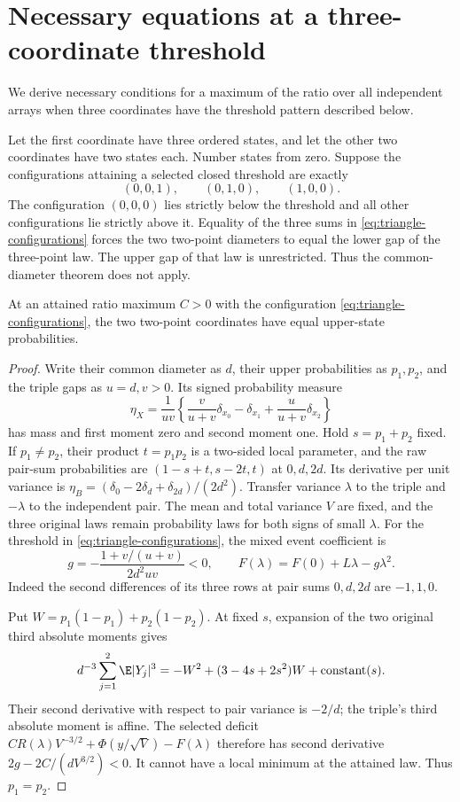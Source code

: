 \section{Necessary equations at a three-coordinate threshold}
\label{sec:triangular-contact}

We derive necessary conditions for a maximum of the ratio over all
independent arrays when three coordinates have the threshold pattern
described below.

Let the first coordinate have three ordered states, and let the other
two coordinates have two states each. Number states from zero. Suppose
the configurations attaining a selected closed threshold are exactly
\begin{equation}\label{eq:triangle-configurations}
                    (0,0,1),\qquad(0,1,0),\qquad(1,0,0).
\end{equation}
The configuration $(0,0,0)$ lies strictly below the threshold and all
other configurations lie strictly above it. Equality of the three sums
in \eqref{eq:triangle-configurations} forces the two two-point diameters
to equal the lower gap of the three-point law. The upper gap of that
law is unrestricted. Thus the common-diameter theorem does not apply.

\begin{proposition}
\label{prop:triangle-equal-probabilities}
At an attained ratio maximum $C>0$ with the configuration
\eqref{eq:triangle-configurations}, the two two-point coordinates have
equal upper-state probabilities.
\end{proposition}
\begin{proof}
Write their common diameter as $d$, their upper probabilities as
$p_1,p_2$, and the triple gaps as $u=d,v>0$. Its signed probability
measure
\[
 \eta_X=\frac1{uv}\left\{
 \frac{v}{u+v}\delta_{x_0}-\delta_{x_1}
                  +\frac{u}{u+v}\delta_{x_2}\right\}
\]
has mass and first moment zero and second moment one. Hold
$s=p_1+p_2$ fixed. If $p_1\ne p_2$, their product $t=p_1p_2$ is a
two-sided local parameter, and the raw pair-sum probabilities are
$(1-s+t,s-2t,t)$ at $0,d,2d$. Its derivative per unit variance is
$\eta_B=(\delta_0-2\delta_d+\delta_{2d})/(2d^2)$.
Transfer variance $\lambda$ to the triple and $-\lambda$ to the
independent pair. The mean and total variance $V$ are fixed, and the
three original laws remain probability laws for both signs of small
$\lambda$. For the threshold in \eqref{eq:triangle-configurations},
the mixed event coefficient is
\[
 g=-\frac{1+v/(u+v)}{2d^2uv}<0,
 \qquad F(\lambda)=F(0)+L\lambda-g\lambda^2.
\]
Indeed the second differences of its three rows at pair sums $0,d,2d$
are $-1,1,0$.

Put $W=p_1(1-p_1)+p_2(1-p_2)$. At fixed $s$, expansion of the two
original third absolute moments gives
\[
 d^{-3}\sum_{j=1}^2\E|Y_j|^3
             =-W^2+(3-4s+2s^2)W+\text{constant}(s).
\]
Their second derivative with respect to pair variance is $-2/d$;
the triple's third absolute moment is affine. The selected deficit
$CR(\lambda)V^{-3/2}+\Phi(y/\sqrt V)-F(\lambda)$ therefore has
second derivative $2g-2C/(dV^{3/2})<0$. It cannot have a local minimum
at the attained law. Thus $p_1=p_2$.
\end{proof}

